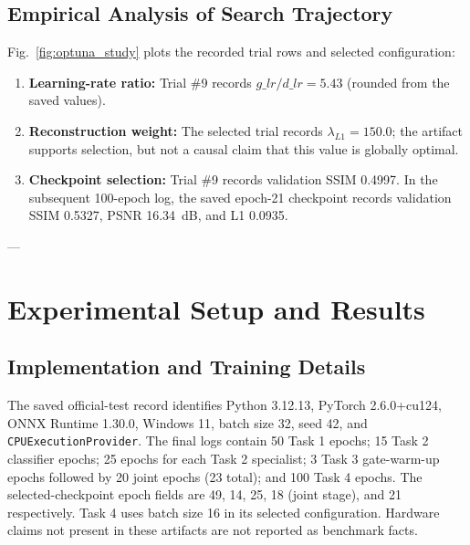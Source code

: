 \documentclass[journal,compsoc]{IEEEtran}
\begin{document}
\subsection{Empirical Analysis of Search Trajectory}
Fig.~\ref{fig:optuna_study} plots the recorded trial rows and selected configuration:
\begin{enumerate}
    \item \textbf{Learning-rate ratio:} Trial \#9 records $g\_lr/d\_lr=5.43$ (rounded from the saved values).
    \item \textbf{Reconstruction weight:} The selected trial records $\lambda_{L1}=150.0$; the artifact supports selection, but not a causal claim that this value is globally optimal.
    \item \textbf{Checkpoint selection:} Trial \#9 records validation SSIM 0.4997. In the subsequent 100-epoch log, the saved epoch-21 checkpoint records validation SSIM 0.5327, PSNR 16.34~dB, and L1 0.0935.
\end{enumerate}

---

\section{Experimental Setup and Results}
\label{sec:experiments}

\subsection{Implementation and Training Details}
The saved official-test record identifies Python 3.12.13, PyTorch 2.6.0+cu124, ONNX Runtime 1.30.0, Windows 11, batch size 32, seed 42, and \texttt{CPUExecutionProvider}. The final logs contain 50 Task 1 epochs; 15 Task 2 classifier epochs; 25 epochs for each Task 2 specialist; 3 Task 3 gate-warm-up epochs followed by 20 joint epochs (23 total); and 100 Task 4 epochs. The selected-checkpoint epoch fields are 49, 14, 25, 18 (joint stage), and 21 respectively. Task 4 uses batch size 16 in its selected configuration. Hardware claims not present in these artifacts are not reported as benchmark facts.
\end{document}
